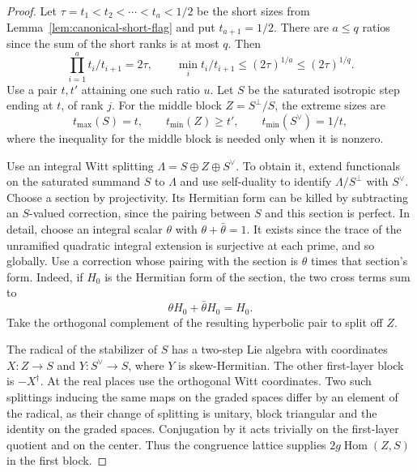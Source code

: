 \begin{proof}

Let \(\tau=t_1<t_2<\cdots<t_a<1/2\) be the short sizes
from Lemma~\ref{lem:canonical-short-flag} and put \(t_{a+1}=1/2\).
There are \(a\le q\) ratios since the sum of the short ranks
is at most \(q\). Then
\[
 \prod_{i=1}^a t_i/t_{i+1}=2\tau,\qquad
 \min_i t_i/t_{i+1}\le(2\tau)^{1/a}\le(2\tau)^{1/q}.
\]
Use a pair \(t,t'\) attaining one such ratio \(u\).
Let \(S\) be the saturated isotropic step ending at \(t\),
of rank \(j\). For the middle block \(Z=S^\perp/S\), the extreme sizes are
\[
 t_{\max}(S)=t,\qquad t_{\min}(Z)\ge t',\qquad t_{\min}(S^\vee)=1/t ,
\]
where the inequality for the middle block is needed only when it is nonzero.


Use an integral Witt splitting
\(\Lambda=S\oplus Z\oplus S^\vee\).
To obtain it, extend functionals on the saturated summand
\(S\) to \(\Lambda\) and use self-duality to identify
\(\Lambda/S^\perp\) with \(S^\vee\).
Choose a section by projectivity. Its Hermitian form can
be killed by subtracting an \(S\)-valued correction,
since the pairing between \(S\) and this section is perfect.
In detail, choose an integral scalar \(\theta\) with
\(\theta+\bar\theta=1\). It exists since the trace of the
unramified quadratic integral extension is surjective at
each prime, and so globally. Use a correction whose pairing
with the section is \(\theta\) times that section's form.
Indeed, if \(H_0\) is the Hermitian form of the section, the two
cross terms sum to
\[
                  \theta H_0+\bar\theta H_0=H_0 .
\]
Take the orthogonal complement of the resulting hyperbolic
pair to split off \(Z\).

The radical of the stabilizer of \(S\) has a two-step
Lie algebra with coordinates \(X:Z\longrightarrow S\)
and \(Y:S^\vee\longrightarrow S\), where \(Y\) is
skew-Hermitian. The other first-layer block is
\(-X^\dagger\). At the real places use the orthogonal Witt
coordinates. Two such splittings inducing the same maps on
the graded spaces differ by an element of the radical, as
their change of splitting is unitary, block triangular and
the identity on the graded spaces. Conjugation by it acts
trivially on the first-layer quotient and on the center.
Thus the congruence lattice supplies \(2g\operatorname{Hom}(Z,S)\)
in the first block.


\end{proof}
